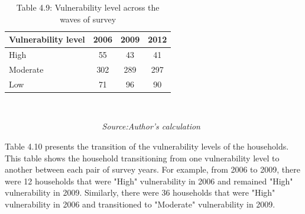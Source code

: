 \documentclass[12pt, a4paper]{article}
\begin{document}
\begin{table}[H]
	\captionsetup{labelformat=empty}
	\captionsetup{labelformat=empty, skip=-7pt} %
	\caption{{Table 4.9}: Vulnerability level across the waves of survey} 	\label{tab:Vulnerabilitylevels} 	\begin{center}
	\begin{tabular}{lccc} \hline
		\textbf{Vulnerability level} & \textbf{2006}            & \textbf{2009}            & \textbf{2012}           \\ \hline
		High                         & 55                       & 43                       & 41                      \\
		Moderate                     & 302                      & 289                      & 297                     \\
		Low                          & 71                       & 96                       & 90                \\ \hline \hline     
	\end{tabular}\\
\end{center}\vspace{-8pt}
\textit{\ \ \ \ \ \ \ \ \ \ \ \ \ \ \  \ \ \ \ \ \ \ \ Source:Author's calculation}
\end{table}

Table 4.10 presents the transition of the vulnerability levels of the households. This table shows the household transitioning from one vulnerability level to another between each pair of survey years. For example, from 2006 to 2009, there were 12 households that were "High" vulnerability in 2006 and remained "High" vulnerability in 2009. Similarly, there were 36 households that were "High" vulnerability in 2006 and transitioned to "Moderate" vulnerability in 2009.
\end{document}
